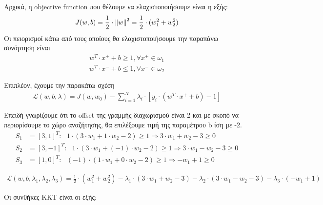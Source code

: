 \documentclass{article}
\begin{document}
	\noindent
	Αρχικά, η objective function που θέλουμε να ελαχιστοποιήσουμε είναι η εξής: 
	\begin{align*}
		J(w,b) = \frac{1}{2} \cdot \left\lVert w\right\rVert^{2} =  \frac{1}{2} \cdot (w_{1}^{2} + w_{2}^{2})
	\end{align*}
	\noindent
	Οι πειορισμοί κάτω από τους οποίους θα ελαχιστοποιήσουμε την παραπάνω συνάρτηση είναι
	\begin{align*}
		w^{T} \cdot x^{+} + b \ge 1, \forall x^{+} \in ω_{1} \\
		w^{T} \cdot x^{-} + b \le 1, \forall x^{-} \in ω_{2}
	\end{align*}	

	\noindent
	Επιπλέον, έχουμε την παρακάτω σχέση
	\begin{align*}
		\mathcal{L}(w,b,λ) = J(w,w_{0}) - \sum_{i=1}^{N} λ_{i} \cdot [y_{i} \cdot (w^{T} \cdot x^{+} + b) - 1]
	\end{align*}
	
	\noindent 
	Επειδή γνωρίζουμε ότι το offset της γραμμής διαχωρισμού είναι 2 και με σκοπό να περιορίσουμε το χώρο αναζήτησης, θα επιλέξουμε τιμή της παραμέτρου b ίση με -2.
	\begin{align*}
		S_{1} &= [3,1]^{T} : \ \ \ 1 \cdot ( 3 \cdot w_{1} + 1 \cdot w_{2} - 2) \ge 1 \Rightarrow 
								   3 \cdot w_{1} + w_{2}  -3 \ge 0\\
		S_{2} &= [3,-1]^{T} : \ \ \ 1 \cdot ( 3 \cdot w_{1} + (-1) \cdot w_{2} - 2) \ge 1 \Rightarrow 
							        3 \cdot w_{1} - w_{2}  - 3 \ge 0\\
		S_{3} &= [1,0]^{T} : \ \ \ (-1) \cdot ( 1 \cdot w_{1} + 0 \cdot w_{2} - 2) \ge 1 \Rightarrow 
								    -w_{1} + 1 \ge 0
	\end{align*}	
	
	\begin{align*}
		\mathcal{L}(w,b,λ_{1},λ_{2},λ_{3}) = \frac{1}{2} \cdot (w_{1}^{2} + w_{2}^{2}) - 
												λ_{1} \cdot (3 \cdot w_{1} + w_{2} - 3) -
												λ_{2} \cdot (3 \cdot w_{1} - w_{2} - 3) -
												λ_{3} \cdot (-w_{1} + 1) 
	\end{align*}

	\pagebreak
	\noindent
	Οι συνθήκες KKT είναι οι εξής:\\
	
\end{document}
